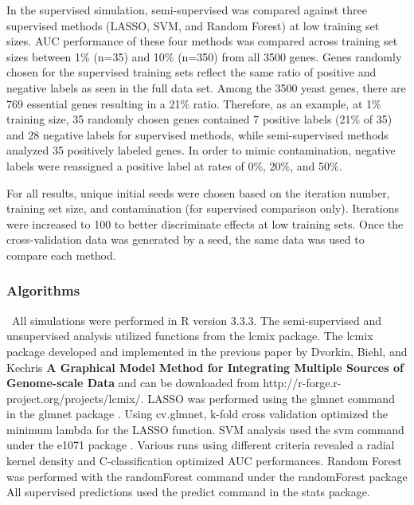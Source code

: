 \documentclass{bmcart}
\begin{document}
In the supervised simulation, semi-supervised was compared against three supervised methods (LASSO, SVM, and Random Forest) at low training set sizes. AUC performance of these four methods was compared across training set sizes between 1\% (n=35) and 10\% (n=350) from all 3500 genes. Genes randomly chosen for the supervised training sets reflect the same ratio of positive and negative labels as seen in the full data set. Among the 3500 yeast genes, there are 769 essential genes resulting in a 21\% ratio. Therefore, as an example, at 1\% training size, 35 randomly chosen genes contained 7 positive labels (21\% of 35) and 28 negative labels for supervised methods, while semi-supervised methods analyzed 35 positively labeled genes. In order to mimic contamination, negative labels were reassigned a positive label at rates of 0\%, 20\%, and 50\%. 

For all results, unique initial seeds were chosen based on the iteration number, training set size, and contamination (for supervised comparison only). Iterations were increased to 100 to better discriminate effects at low training sets. Once the cross-validation data was generated by a seed, the same data was used to compare each method.  

\subsubsection*{Algorithms}\label{subsubsection:algorithm}\
All simulations were performed in R version 3.3.3. The semi-supervised and unsupervised analysis utilized functions from the lcmix package. The lcmix package developed and implemented in the previous paper by Dvorkin, Biehl, and Kechris \textbf{A Graphical Model Method for Integrating Multiple Sources of Genome-scale Data} \citep{Dvorkin2013a} and can be downloaded from http://r-forge.r-project.org/projects/lcmix/. LASSO was performed using the glmnet command in the glmnet package \citep{Friedman}. Using cv.glmnet, k-fold cross validation optimized the minimum lambda for the LASSO function. SVM analysis used the svm command under the e1071 package \citep{Meyer}. Various runs using different criteria revealed a radial kernel density and C-classification optimized AUC performances. Random Forest was performed with the randomForest command under the randomForest package \citep{Liaw} All supervised predictions used the predict command in the stats package. 
\end{document}
